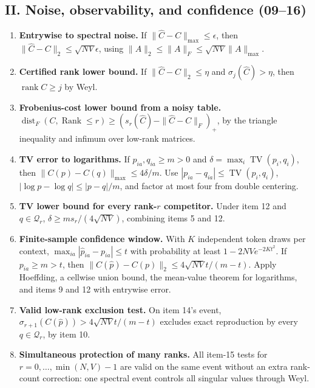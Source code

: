 \documentclass[11pt,a4paper,oneside]{book}
\DeclareMathOperator{\rank}{rank}\DeclareMathOperator{\Tr}{Tr}
\begin{document}
\subsection*{II. Noise, observability, and confidence (09--16)}
\begin{enumerate}[start=9]
\item \textbf{Entrywise to spectral noise.} If $\|\widehat C-C\|_{\max}\le\epsilon$, then $\|\widehat C-C\|_2\le\sqrt{NV}\epsilon$, using $\|A\|_2\le\|A\|_F\le\sqrt{NV}\|A\|_{\max}$.
\item \textbf{Certified rank lower bound.} If $\|\widehat C-C\|_2\le\eta$ and $\sigma_j(\widehat C)>\eta$, then $\rank C\ge j$ by Weyl.
\item \textbf{Frobenius-cost lower bound from a noisy table.} $\operatorname{dist}_F(C,\operatorname{Rank}\le r)\ge(s_r(\widehat C)-\|\widehat C-C\|_F)_+$, by the triangle inequality and infimum over low-rank matrices.
\item \textbf{TV error to logarithms.} If $p_{ia},q_{ia}\ge m>0$ and $\delta=\max_i\operatorname{TV}(p_i,q_i)$, then $\|C(p)-C(q)\|_{\max}\le4\delta/m$. Use $|p_{ia}-q_{ia}|\le\operatorname{TV}(p_i,q_i)$, $|\log p-\log q|\le|p-q|/m$, and factor at most four from double centering.
\item \textbf{TV lower bound for every rank-$r$ competitor.} Under item 12 and $q\in\mathcal Q_r$, $\delta\ge ms_r/(4\sqrt{NV})$, combining items 5 and 12.
\item \textbf{Finite-sample confidence window.} With $K$ independent token draws per context, $\max_{ia}|\widehat p_{ia}-p_{ia}|\le t$ with probability at least $1-2NV e^{-2Kt^2}$. If $p_{ia}\ge m>t$, then $\|C(\widehat p)-C(p)\|_2\le4\sqrt{NV}t/(m-t)$. Apply Hoeffding, a cellwise union bound, the mean-value theorem for logarithms, and items 9 and 12 with entrywise error.
\item \textbf{Valid low-rank exclusion test.} On item 14's event, $\sigma_{r+1}(C(\widehat p))>4\sqrt{NV}t/(m-t)$ excludes exact reproduction by every $q\in\mathcal Q_r$, by item 10.
\item \textbf{Simultaneous protection of many ranks.} All item-15 tests for $r=0,\ldots,\min(N,V)-1$ are valid on the same event without an extra rank-count correction: one spectral event controls all singular values through Weyl.
\end{enumerate}
\end{document}
